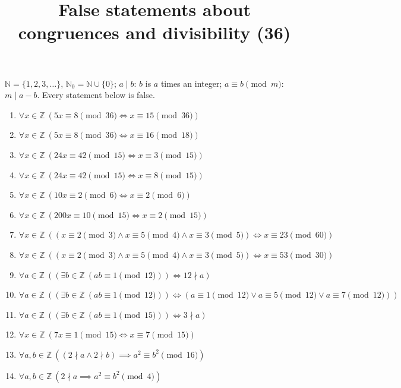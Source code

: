 \documentclass[11pt,a4paper]{article}
\title{False statements about congruences and divisibility (36)}
\author{}
\date{}
\begin{document}
\maketitle
$\mathbb{N} = \{1, 2, 3, \ldots\}$, $\mathbb{N}_{0} = \mathbb{N} \cup \{0\}$; $a \mid b$: $b$ is $a$ times an integer; $a \equiv b \pmod{m}$: $m \mid a - b$. Every statement below is false.

\begin{enumerate}
\item $\displaystyle \forall x \in \mathbb{Z}\ (5x \equiv 8 \pmod{36} \iff x \equiv 15 \pmod{36})$
\item $\displaystyle \forall x \in \mathbb{Z}\ (5x \equiv 8 \pmod{36} \iff x \equiv 16 \pmod{18})$
\item $\displaystyle \forall x \in \mathbb{Z}\ (24x \equiv 42 \pmod{15} \iff x \equiv 3 \pmod{15})$
\item $\displaystyle \forall x \in \mathbb{Z}\ (24x \equiv 42 \pmod{15} \iff x \equiv 8 \pmod{15})$
\item $\displaystyle \forall x \in \mathbb{Z}\ (10x \equiv 2 \pmod{6} \iff x \equiv 2 \pmod{6})$
\item $\displaystyle \forall x \in \mathbb{Z}\ (200x \equiv 10 \pmod{15} \iff x \equiv 2 \pmod{15})$
\item $\displaystyle \forall x \in \mathbb{Z}\ ((x \equiv 2 \pmod{3} \land x \equiv 5 \pmod{4} \land x \equiv 3 \pmod{5}) \iff x \equiv 23 \pmod{60})$
\item $\displaystyle \forall x \in \mathbb{Z}\ ((x \equiv 2 \pmod{3} \land x \equiv 5 \pmod{4} \land x \equiv 3 \pmod{5}) \iff x \equiv 53 \pmod{30})$
\item $\displaystyle \forall a \in \mathbb{Z}\ ((\exists b \in \mathbb{Z}\ (ab \equiv 1 \pmod{12})) \iff 12 \nmid a)$
\item $\displaystyle \forall a \in \mathbb{Z}\ ((\exists b \in \mathbb{Z}\ (ab \equiv 1 \pmod{12})) \iff (a \equiv 1 \pmod{12} \lor a \equiv 5 \pmod{12} \lor a \equiv 7 \pmod{12}))$
\item $\displaystyle \forall a \in \mathbb{Z}\ ((\exists b \in \mathbb{Z}\ (ab \equiv 1 \pmod{15})) \iff 3 \nmid a)$
\item $\displaystyle \forall x \in \mathbb{Z}\ (7x \equiv 1 \pmod{15} \iff x \equiv 7 \pmod{15})$
\item $\displaystyle \forall a, b \in \mathbb{Z}\ ((2 \nmid a \land 2 \nmid b) \implies a^{2} \equiv b^{2} \pmod{16})$
\item $\displaystyle \forall a, b \in \mathbb{Z}\ (2 \nmid a \implies a^{2} \equiv b^{2} \pmod{4})$

\end{enumerate}
\end{document}
